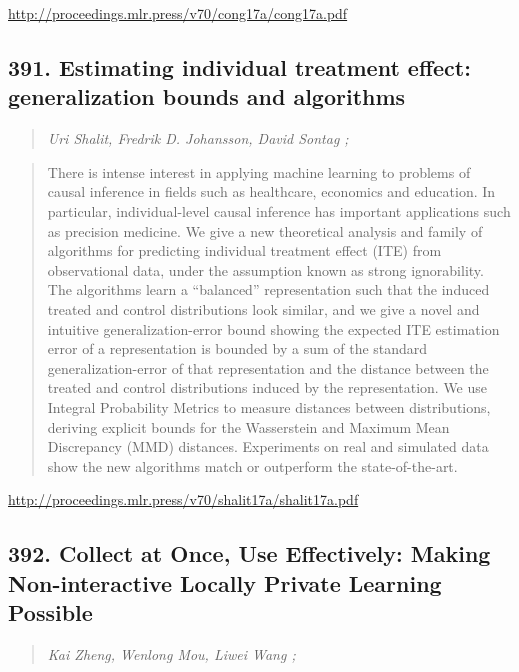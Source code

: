 \documentclass{article}
\begin{document}
\href{http://proceedings.mlr.press/v70/cong17a/cong17a.pdf}{http://proceedings.mlr.press/v70/cong17a/cong17a.pdf}

\subsection{391. Estimating individual treatment effect: generalization bounds and algorithms}

\begin{quote}
\footnotesize{\textit{Uri Shalit, Fredrik D. Johansson, David Sontag ;}}

\end{quote}

\begin{quote}
    There is intense interest in applying machine learning to problems of causal inference in fields such as healthcare, economics and education. In particular, individual-level causal inference has important applications such as precision medicine. We give a new theoretical analysis and family of algorithms for predicting individual treatment effect (ITE) from observational data, under the assumption known as strong ignorability. The algorithms learn a “balanced” representation such that the induced treated and control distributions look similar, and we give a novel and intuitive generalization-error bound showing the expected ITE estimation error of a representation is bounded by a sum of the standard generalization-error of that representation and the distance between the treated and control distributions induced by the representation. We use Integral Probability Metrics to measure distances between distributions, deriving explicit bounds for the Wasserstein and Maximum Mean Discrepancy (MMD) distances. Experiments on real and simulated data show the new algorithms match or outperform the state-of-the-art.  
\end{quote}

\href{http://proceedings.mlr.press/v70/shalit17a/shalit17a.pdf}{http://proceedings.mlr.press/v70/shalit17a/shalit17a.pdf}

\subsection{392. Collect at Once, Use Effectively: Making Non-interactive Locally Private Learning Possible}

\begin{quote}
\footnotesize{\textit{Kai Zheng, Wenlong Mou, Liwei Wang ;}}

\end{quote}
\end{document}
